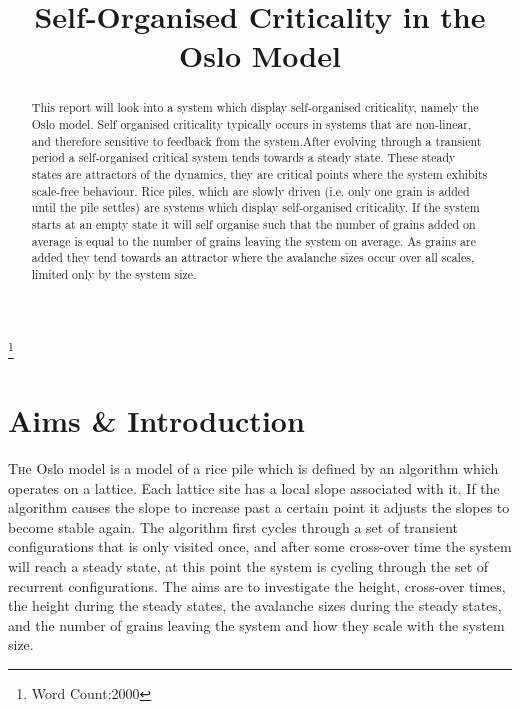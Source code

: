 \documentclass[twoside]{article}
\title{\vspace{-15mm}\fontsize{18pt}{10pt}\selectfont\textbf{Self-Organised Criticality in the Oslo Model}\vspace{-15mm}} %
\date{}
\begin{document}
\normalem
\maketitle %

\thispagestyle{fancy} %


\begin{abstract}

\noindent 
This report will look into a system which display self-organised criticality, namely the Oslo model. Self organised criticality typically occurs in systems that are non-linear, and therefore sensitive to feedback from the system.After evolving through a transient period a self-organised critical system tends towards a steady state. These steady states are attractors of the dynamics, they are critical points where the system exhibits scale-free behaviour. Rice piles, which are slowly driven (i.e. only one grain is added until the pile settles) are systems which display self-organised criticality. If the system starts at an empty state it will self organise such that the number of grains added on average is equal to the number of grains leaving the system on average. As grains are added they tend towards an attractor where the avalanche sizes occur over all scales, limited only by the system size.
\end{abstract}


{\let\thefootnote\relax\footnote{Word Count:2000}}

\vspace{-5mm}
\section{Aims \& Introduction}

\lettrine[nindent=0em,lines=2]{T}he Oslo model is a model of a rice pile which is defined by an algorithm which operates on a lattice. Each lattice site has a local slope associated with it. If the algorithm causes the slope to increase past a certain point it adjusts the slopes to become stable again. The algorithm first cycles through a set of transient configurations that is only visited once, and after some cross-over time the system will reach a steady state, at this point the system is cycling through the set of recurrent configurations. The aims are to investigate the height, cross-over times, the height during the steady states, the avalanche sizes during the steady states, and the number of grains leaving the system and how they scale with the system size.
\end{document}
